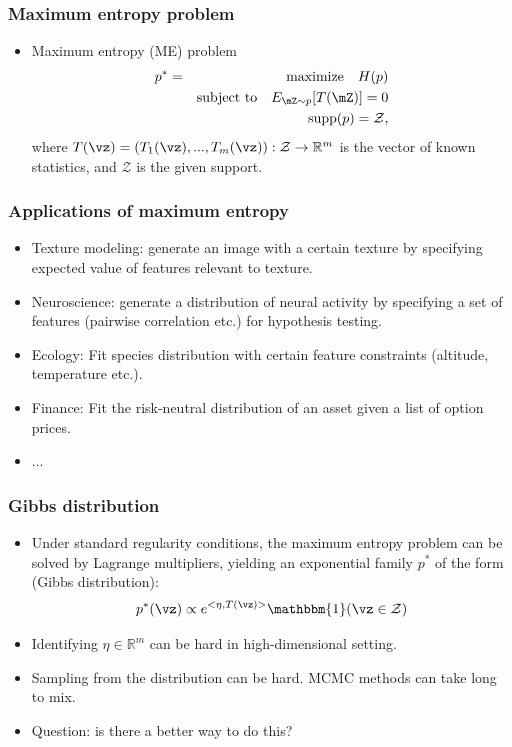 \documentclass[16pt,presentation]{beamer}
\begin{document}
\begin{frame}
\frametitle{Maximum entropy problem}
\begin{itemize}
\item Maximum entropy (ME) problem
\begin{eqnarray*}
p^{*} &=& \text{maximize}~~~ H(p) \\
&& \text{subject to} ~~~E_{\mZ\sim p}[T(\mZ)]=0 \nonumber\\
&& ~~~~~~~~~~~~~~~~~~\supp(p)=\mathcal{Z} \nonumber,
\end{eqnarray*}
where $T(\vz) = (T_1(\vz),...,T_m(\vz)):\mathcal{Z}\rightarrow \mathbb{R}^{m}$ is the vector of known statistics, and $\mathcal{Z}$ is the given support.
\end{itemize}
\end{frame}

\begin{frame}
\frametitle{Applications of maximum entropy}
\begin{itemize}
\item \alert{Texture modeling}: generate an image with a certain texture by specifying expected value of features relevant to texture.
\item \alert{Neuroscience}: generate a distribution of neural activity by specifying a set of features (pairwise correlation etc.) for hypothesis testing.
\item \alert{Ecology}: Fit species distribution with certain feature constraints (altitude, temperature etc.).
\item \alert{Finance}: Fit the risk-neutral distribution of an asset given a list of option prices.
\item ...
\end{itemize}
\end{frame}

\begin{frame}
\frametitle{Gibbs distribution}
\begin{itemize}
\item Under standard regularity conditions, the maximum entropy problem can be solved by Lagrange multipliers, yielding an exponential family $p^*$ of the form (Gibbs distribution):
\[\label{curmet}
p^*(\vz) \propto e^{<\eta, T(\vz)>} \mathbbm{1}(\vz \in \mathcal{Z})
\]
\item Identifying $\eta \in \mathbb{R}^m$ can be hard in high-dimensional setting.
\item Sampling from the distribution can be hard. MCMC methods can take long to mix.
\item \alert{Question}: is there a better way to do this?
\end{itemize}
\end{frame}
\end{document}

